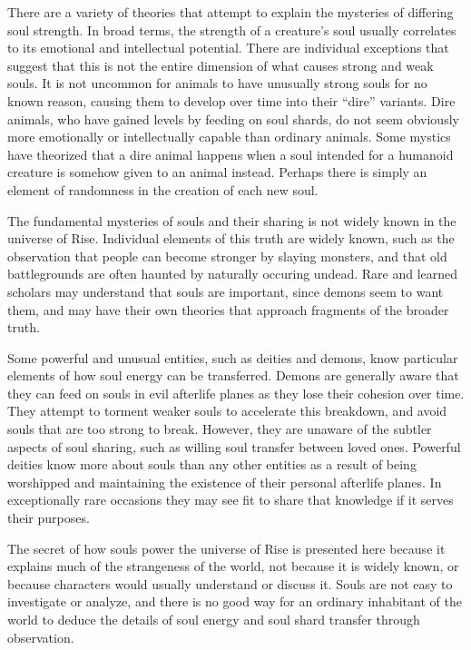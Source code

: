         There are a variety of theories that attempt to explain the mysteries of differing soul strength.
        In broad terms, the strength of a creature's soul usually correlates to its emotional and intellectual potential.
        There are individual exceptions that suggest that this is not the entire dimension of what causes strong and weak souls.
        It is not uncommon for animals to have unusually strong souls for no known reason, causing them to develop over time into their ``dire'' variants.
        Dire animals, who have gained levels by feeding on soul shards, do not seem obviously more emotionally or intellectually capable than ordinary animals.
        Some mystics have theorized that a dire animal happens when a soul intended for a humanoid creature is somehow given to an animal instead.
        Perhaps there is simply an element of randomness in the creation of each new soul.

        The fundamental mysteries of souls and their sharing is not widely known in the universe of Rise.
        Individual elements of this truth are widely known, such as the observation that people can become stronger by slaying monsters, and that old battlegrounds are often haunted by naturally occuring undead.
        Rare and learned scholars may understand that souls are important, since demons seem to want them, and may have their own theories that approach fragments of the broader truth.

        Some powerful and unusual entities, such as deities and demons, know particular elements of how soul energy can be transferred.
        Demons are generally aware that they can feed on souls in evil afterlife planes as they lose their cohesion over time.
        They attempt to torment weaker souls to accelerate this breakdown, and avoid souls that are too strong to break.
        However, they are unaware of the subtler aspects of soul sharing, such as willing soul transfer between loved ones.
        Powerful deities know more about souls than any other entities as a result of being worshipped and maintaining the existence of their personal afterlife planes.
        In exceptionally rare occasions they may see fit to share that knowledge if it serves their purposes.

        The secret of how souls power the universe of Rise is presented here because it explains much of the strangeness of the world, not because it is widely known, or because characters would usually understand or discuss it.
        Souls are not easy to investigate or analyze, and there is no good way for an ordinary inhabitant of the world to deduce the details of soul energy and soul shard transfer through observation.
